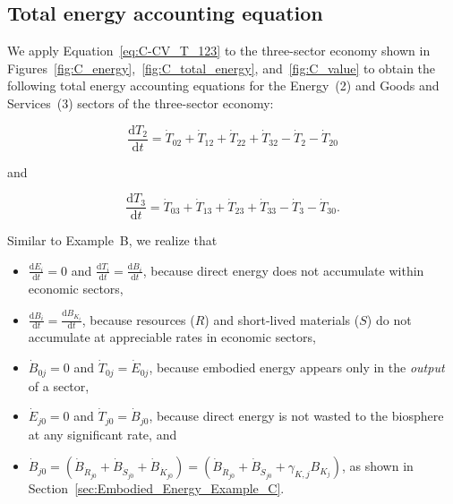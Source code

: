 \subsection{Total energy accounting equation}

We apply Equation~\ref{eq:C-CV_T_123} to the three-sector
economy shown in 
Figures~\ref{fig:C_energy},~\ref{fig:C_total_energy}, and~\ref{fig:C_value}
to obtain the following total energy accounting equations
for the Energy~(2) and Goods and Services~(3) sectors 
of the three-sector economy:

\begin{equation} \label{eq:C-Total_Energy_Sec_2-a}
	\frac{\mathrm{d}T_{2}}{\mathrm{d}t} 
	= \dot{T}_{02}  
	+ \dot{T}_{12}
	+ \dot{T}_{22}
	+ \dot{T}_{32}
	- \dot{T}_{2}
	- \dot{T}_{20}
\end{equation}

\noindent{}and

\begin{equation} \label{eq:C-Total_Energy_Sec_3-a}
	\frac{\mathrm{d}T_{3}}{\mathrm{d}t} 
	= \dot{T}_{03}  
	+ \dot{T}_{13}
	+ \dot{T}_{23}
	+ \dot{T}_{33}
	- \dot{T}_{3}
	- \dot{T}_{30}.
\end{equation}

\noindent{}Similar to Example~B, we realize that 

\begin{itemize}
	\item{$\frac{\mathrm{d}E_i}{\mathrm{d}t} = 0$
		and
		$\frac{\mathrm{d}T_i}{\mathrm{d}t} = \frac{\mathrm{d}B_i}{\mathrm{d}t}$, 
		because direct energy
		does not accumulate within economic sectors,}
	\item{$\frac{\mathrm{d}B_i}{\mathrm{d}t} = \frac{\mathrm{d}B_{K_{i}}}{\mathrm{d}t}$,
		because resources ($R$) and short-lived materials ($S$) do not 
		accumulate at appreciable rates in economic sectors,}
	\item{$\dot{B}_{0j} = 0$ and $\dot{T}_{0j} = \dot{E}_{0j}$,
		because embodied energy appears only in the \emph{output} of a sector,}
	\item{$\dot{E}_{j0} = 0$ and $\dot{T}_{j0} = \dot{B}_{j0}$, 
	because direct energy is not wasted to the biosphere at any significant rate, and} 
	\item{$\dot{B}_{j0} = \left( \dot{B}_{\dot{R}_{j0}} 
							+ \dot{B}_{\dot{S}_{j0}}
							+ \dot{B}_{\dot{K}_{j0}}
							\right)
						= \left( \dot{B}_{\dot{R}_{j0}} 
							+ \dot{B}_{\dot{S}_{j0}}
							+ \gamma_{K,j} B_{K_{j}}
							\right)$, as shown in Section~\ref{sec:Embodied_Energy_Example_C}.}
\end{itemize}

